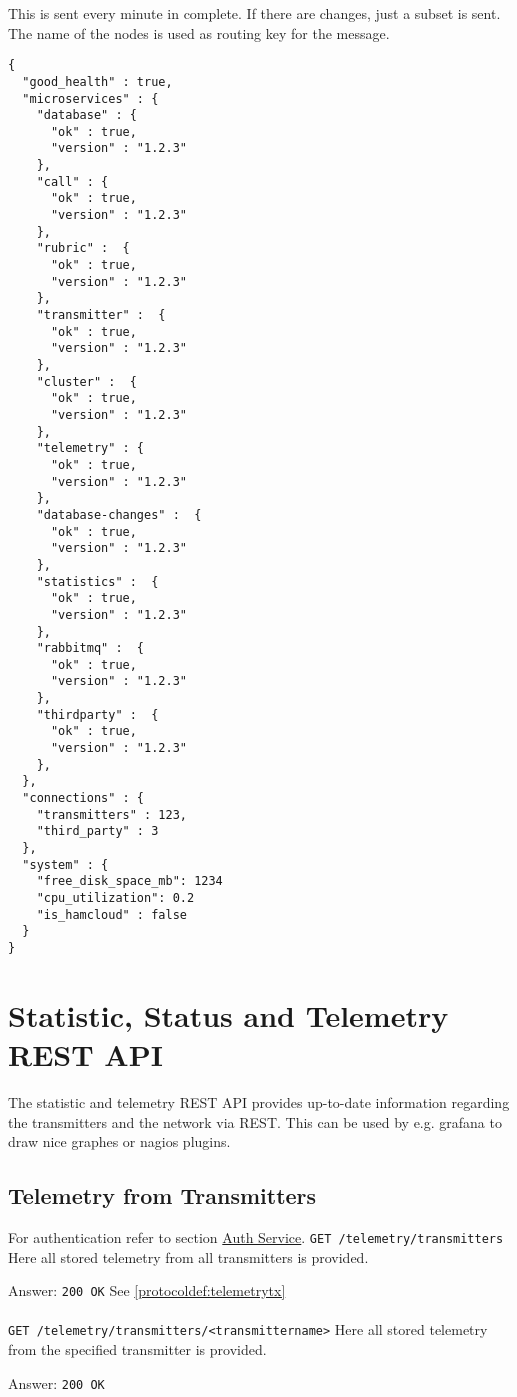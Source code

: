 This is sent every minute in complete. If there are changes, just a subset is sent.
The name of the nodes is used as routing key for the message.
\begin{lstlisting}
{
  "good_health" : true,
  "microservices" : {
    "database" : {
      "ok" : true,
      "version" : "1.2.3"
    },
    "call" : {
      "ok" : true,
      "version" : "1.2.3"
    },
    "rubric" :  {
      "ok" : true,
      "version" : "1.2.3"
    },
    "transmitter" :  {
      "ok" : true,
      "version" : "1.2.3"
    },
    "cluster" :  {
      "ok" : true,
      "version" : "1.2.3"
    },
    "telemetry" : {
      "ok" : true,
      "version" : "1.2.3"
    },
    "database-changes" :  {
      "ok" : true,
      "version" : "1.2.3"
    },
    "statistics" :  {
      "ok" : true,
      "version" : "1.2.3"
    },
    "rabbitmq" :  {
      "ok" : true,
      "version" : "1.2.3"
    },
    "thirdparty" :  {
      "ok" : true,
      "version" : "1.2.3"
    },
  },
  "connections" : {
    "transmitters" : 123,
    "third_party" : 3
  },
  "system" : {
    "free_disk_space_mb": 1234
    "cpu_utilization": 0.2
    "is_hamcloud" : false
  }
}
\end{lstlisting}

\section{Statistic, Status and Telemetry REST API}
The statistic and telemetry REST API provides up-to-date information regarding the transmitters and the network via REST. This can be used by e.g. grafana to draw nice graphes or nagios plugins.





\subsection{Telemetry from Transmitters}
For authentication refer to section \hyperref[protocoldef:Auth]{Auth Service}.
\texttt{GET /telemetry/transmitters}
Here all stored telemetry from all transmitters is provided.

Answer:
\texttt{200 OK}
See \ref{protocoldef:telemetrytx}\\\\

\texttt{GET /telemetry/transmitters/<transmittername>}
Here all stored telemetry from the specified transmitter is provided.

Answer:
\texttt{200 OK}

